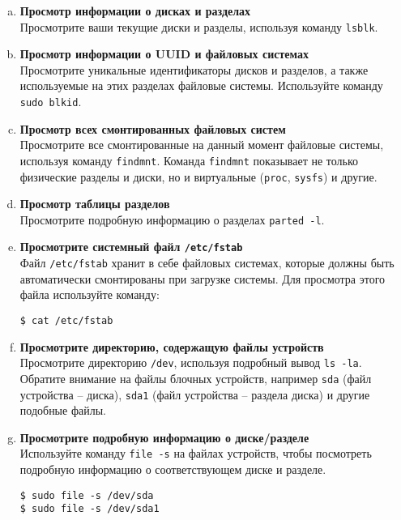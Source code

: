 \documentclass{article}
\begin{document}
\begin{enumerate}[a.]
\item \textbf{Просмотр информации о дисках и разделах}\\
Просмотрите ваши текущие диски и разделы, используя команду \texttt{lsblk}.

\item \textbf{Просмотр информации о UUID и файловых системах}\\
Просмотрите уникальные идентификаторы дисков и разделов, а также используемые на этих разделах файловые системы. Используйте команду  \texttt{sudo blkid}.

\item \textbf{Просмотр всех смонтированных файловых систем}\\
Просмотрите все смонтированные на данный момент файловые системы, используя команду \texttt{findmnt}. Команда \texttt{findmnt} показывает не только физические разделы и диски, но и виртуальные (\texttt{proc}, \texttt{sysfs}) и другие.

\item \textbf{Просмотр таблицы разделов}\\
Просмотрите подробную информацию о разделах \texttt{parted -l}.

\item \textbf{Просмотрите системный файл \texttt{/etc/fstab}}\\
Файл \texttt{/etc/fstab} хранит в себе файловых системах, которые должны быть автоматически смонтированы при загрузке системы. Для просмотра этого файла используйте команду:
\begin{lstlisting}
$ cat /etc/fstab
\end{lstlisting}

\item \textbf{Просмотрите директорию, содержащую файлы устройств}\\
Просмотрите директорию \texttt{/dev}, используя подробный вывод \texttt{ls -la}. Обратите внимание на  файлы блочных устройств, например \texttt{sda} (файл устройства -- диска), \texttt{sda1} (файл устройства -- раздела диска) и другие подобные файлы.

\item \textbf{Просмотрите подробную информацию о диске/разделе}\\
Используйте команду \texttt{file -s} на файлах устройств, чтобы посмотреть подробную информацию о соответствующем диске и разделе.
\begin{lstlisting}
$ sudo file -s /dev/sda
$ sudo file -s /dev/sda1
\end{lstlisting}


\end{enumerate}
\end{document}
